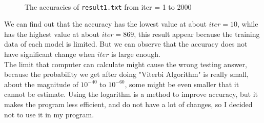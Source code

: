 \documentclass{article}
\newcommand\n{\mbox{\qquad}}
\begin{document}
\begin{figure}[h!]\
  \begin{center}
    \caption{The accuracies of \texttt{result1.txt} from iter = 1 to 2000}
  \end{center}
\end{figure}

\n We can find out that the accuracy has the lowest value at about $iter = 10$, while has the highest value at about $iter = 869$, this result appear because the training data of each model is limited. But we can observe that the accuracy does not have significant change when $iter$ is large enough. \\
\n The limit that computer can calculate might cause the wrong testing answer, because the probability we get after doing "Viterbi Algorithm" is really small, about the magnitude of $10^{-40}$ to $10^{-60}$, some might be even smaller that it cannot be estimate. Using the logarithm is a method to improve accuracy, but it makes the program less efficient, and do not have a lot of changes, so I decided not to use it in my program.
\end{document}
